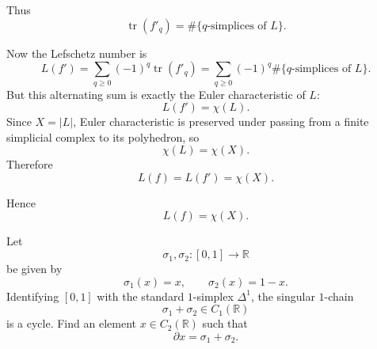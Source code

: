 \begin{solution}
Thus
\[
\operatorname{tr}(f'_q)=\#\{\text{\(q\)-simplices of }L\}.
\]

Now the Lefschetz number is
\[
L(f')=\sum_{q\ge 0}(-1)^q \operatorname{tr}(f'_q)
=\sum_{q\ge 0}(-1)^q \#\{\text{\(q\)-simplices of }L\}.
\]
But this alternating sum is exactly the Euler characteristic of \(L\):
\[
L(f')=\chi(L).
\]
Since \(X=|L|\), Euler characteristic is preserved under passing from a finite simplicial complex to its polyhedron, so
\[
\chi(L)=\chi(X).
\]
Therefore
\[
L(f)=L(f')=\chi(X).
\]

Hence
\[
\boxed{L(f)=\chi(X).}
\]
\end{solution}

\begin{problem}
Let
\[
\sigma_1,\sigma_2:[0,1]\to \mathbb{R}
\]
be given by
\[
\sigma_1(x)=x,
\qquad
\sigma_2(x)=1-x.
\]
Identifying \([0,1]\) with the standard \(1\)-simplex \(\Delta^1\), the singular \(1\)-chain
\[
\sigma_1+\sigma_2\in C_1(\mathbb{R})
\]
is a cycle. Find an element \(x\in C_2(\mathbb{R})\) such that
\[
\partial x=\sigma_1+\sigma_2.
\]
\end{problem}

